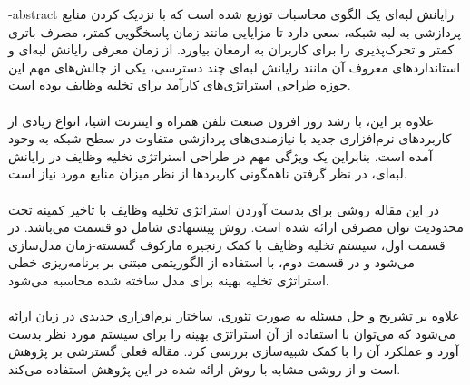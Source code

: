 \esalatPage
\mojavezPage

 \newpage

% 
% 
% 
% 
% 
% 
\fa-abstract{
رایانش لبه‌ای یک الگوی محاسبات توزیع شده است که با نزدیک کردن منابع پردازشی به لبه شبکه، سعی دارد تا مزایایی مانند زمان پاسخگویی کمتر، مصرف باتری کمتر و تحرک‌پذیری را برای کاربران به ارمغان بیاورد. از زمان معرفی رایانش لبه‌ای و استانداردهای معروف آن مانند رایانش لبه‌ای چند دسترسی، یکی از چالش‌های مهم این حوزه طراحی استراتژی‌های کارآمد برای تخلیه وظایف بوده است. \\ \\ علاوه بر این، با رشد روز افزون صنعت تلفن همراه و اینترنت اشیا، انواع زیادی از کاربردهای نرم‌افزاری جدید با نیازمندی‌های پردازشی متفاوت در سطح شبکه به وجود آمده است. بنابراین یک ویژگی مهم در طراحی استراتژی تخلیه وظایف در رایانش لبه‌ای، در نظر گرفتن ناهمگونی کاربردها از نظر میزان منابع مورد نیاز است. \\ \\ در این مقاله روشی برای بدست آوردن استراتژی تخلیه وظایف با تاخیر کمینه تحت محدودیت توان مصرفی ارائه شده است. روش پیشنهادی شامل دو قسمت می‌باشد. در قسمت اول، سیستم تخلیه وظایف با کمک زنجیره مارکوف گسسته-زمان مدل‌سازی می‌شود و در قسمت دوم، با استفاده از الگوریتمی مبتنی بر برنامه‌ریزی خطی استراتژی تخلیه بهینه برای مدل ساخته شده محاسبه می‌شود. \\ \\ علاوه بر تشریح و حل مسئله به صورت تئوری، ساختار نرم‌افزاری جدیدی در زبان  ارائه می‌شود که می‌توان با استفاده از آن استراتژی بهینه را برای سیستم مورد نظر بدست آورد و عملکرد آن را با کمک شبیه‌سازی بررسی کرد. مقاله فعلی گسترشی بر پژوهش \cite{Liu} است و از روشی مشابه با روش ارائه شده در این پژوهش استفاده می‌کند.
}

\abstractPage

\newpage\clearpage